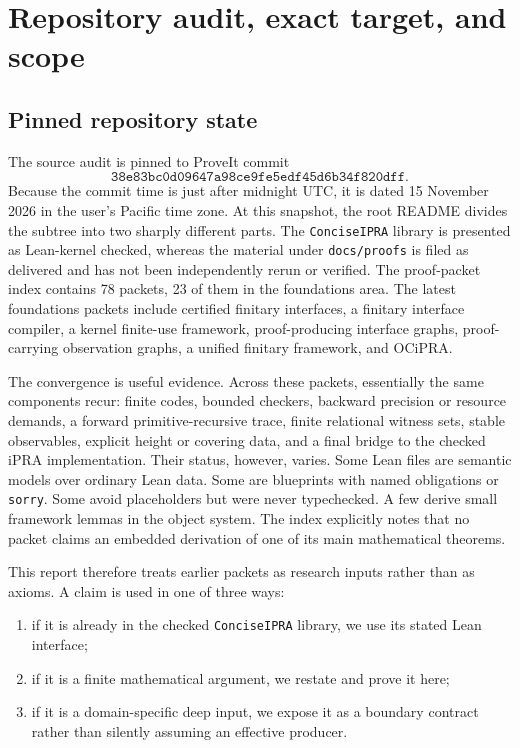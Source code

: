 \section{Repository audit, exact target, and scope}
\label{sec:audit}

\subsection{Pinned repository state}

The source audit is pinned to ProveIt commit
\[
\texttt{38e83bc0d09647a98ce9fe5edf45d6b34f820dff}.
\]
Because the commit time is just after midnight UTC, it is dated 15 November 2026 in the user's
Pacific time zone.  At this snapshot, the root README divides the subtree into two sharply different
parts.  The \texttt{ConciseIPRA} library is presented as Lean-kernel checked, whereas the material under
\texttt{docs/proofs} is filed as delivered and has not been independently rerun or verified.  The proof-packet
index contains 78 packets, 23 of them in the foundations area.  The latest foundations packets include
certified finitary interfaces, a finitary interface compiler, a kernel finite-use framework, proof-producing
interface graphs, proof-carrying observation graphs, a unified finitary framework, and OCiPRA.

The convergence is useful evidence.  Across these packets, essentially the same components recur:
finite codes, bounded checkers, backward precision or resource demands, a forward primitive-recursive
trace, finite relational witness sets, stable observables, explicit height or covering data, and a final
bridge to the checked iPRA implementation.  Their status, however, varies.  Some Lean files are semantic
models over ordinary Lean data.  Some are blueprints with named obligations or \texttt{sorry}.  Some avoid
placeholders but were never typechecked.  A few derive small framework lemmas in the object system.  The
index explicitly notes that no packet claims an embedded derivation of one of its main mathematical
theorems.

This report therefore treats earlier packets as research inputs rather than as axioms.  A claim is used in
one of three ways:
\begin{enumerate}
  \item if it is already in the checked \texttt{ConciseIPRA} library, we use its stated Lean interface;
  \item if it is a finite mathematical argument, we restate and prove it here;
  \item if it is a domain-specific deep input, we expose it as a boundary contract rather than silently
        assuming an effective producer.
\end{enumerate}

